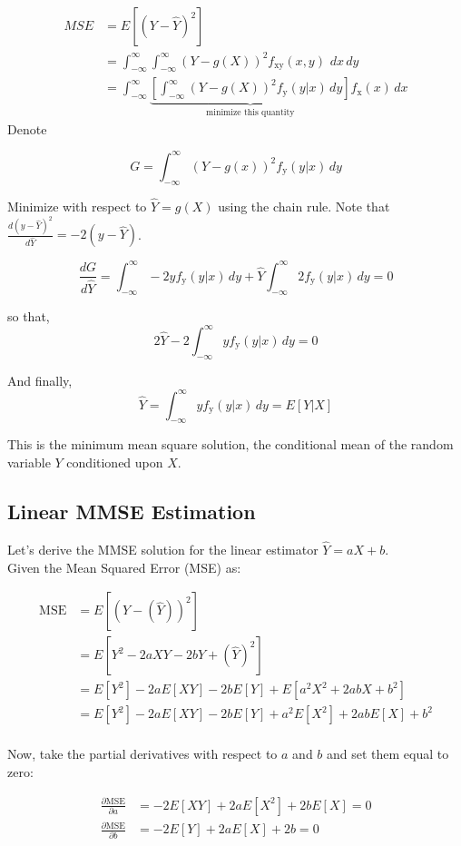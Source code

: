 \documentclass[12pt]{book}
\theoremstyle{definition}
\begin{document}
\[
\begin{aligned}
MSE &= E[ (Y - \hat{Y})^2]\\
&= \int_{-\infty}^{\infty} \int_{-\infty}^{\infty} (Y-g(X))^2 f_\mathrm{xy}
(x,y) \, \, dx \, dy \\
&= \int_{-\infty}^{\infty} \underbrace{\left [ \int_{-\infty}^{\infty} (Y-g(X))^2 f_\mathrm{y}(y|x) \, dy \right ]}_{\text{minimize this quantity}} f_\mathrm{x}(x) \, dx 
\end{aligned}
\]
Denote

\[
G = \int_{-\infty}^{\infty} (Y-g(x))^2 f_\mathrm{y}(y|x) \, dy
\]

Minimize with respect to \(\hat{Y}=g(X)\) using the chain rule. Note that \(\frac{d(y-\hat{Y})^2}{d \hat{Y}} = -2(y-\hat{Y})\).

\[
\frac{dG}{d\hat{Y}} = \int_{-\infty}^{\infty} -2y f_\mathrm{y}(y|x) \, dy + \hat{Y}\int_{-\infty}^{\infty}2 f_\mathrm{y}(y|x) \, dy = 0
\]

so that,
\[
2 \hat{Y} - 2 \int_{-\infty}^{\infty} y f_\mathrm{y}(y|x) \, dy = 0
\]

And finally,
\[
\boxed{\hat{Y} =  \int_{-\infty}^{\infty} y f_\mathrm{y}(y|x) \, dy = E[Y|X]}
\]

This is the minimum mean square solution, the conditional mean of the random variable  \(Y\) conditioned upon \(X\).

\subsection{Linear MMSE Estimation}

Let's derive the MMSE solution for the linear estimator \(\hat{Y} = aX + b\).\\

Given the Mean Squared Error (MSE) as:

\begin{align*}
\text{MSE} &= E[(Y - (\hat{Y}))^2] \\
&= E[Y^2 - 2aXY - 2bY + (\hat{Y})^2] \\
&= E[Y^2] - 2aE[XY] - 2bE[Y] + E[a^2X^2 + 2abX + b^2] \\
&= E[Y^2] - 2aE[XY] - 2bE[Y] + a^2E[X^2] + 2abE[X] + b^2 \\
\end{align*}

Now, take the partial derivatives with respect to \(a\) and \(b\) and set them equal to zero:


\begin{align*}
\frac{\partial \text{MSE}}{\partial a} &= -2E[XY] + 2aE[X^2] + 2bE[X] = 0 \\
\frac{\partial \text{MSE}}{\partial b} &= -2E[Y] + 2aE[X] + 2b = 0
\end{align*}
\end{document}
